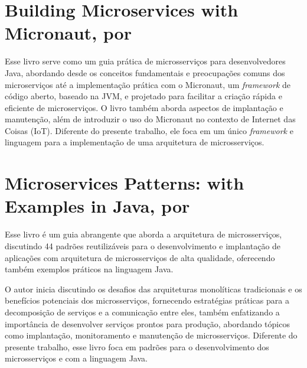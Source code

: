 \section{Building Microservices with Micronaut, por \texorpdfstring{}{Singh, Dawood e The Micronaut® Foundation (2021)}}
Esse livro serve como um guia prática de microsserviços para desenvolvedores Java, abordando desde os conceitos fundamentais e preocupações comuns dos microserviços até a implementação prática com o Micronaut, um \emph{framework} de código aberto, baseado na JVM, e projetado para facilitar a criação rápida e eficiente de microserviços. O livro também aborda aspectos de implantação e manutenção, além de introduzir o uso do Micronaut no contexto de Internet das Coisas (IoT). Diferente do presente trabalho, ele foca em um único \emph{framework} e linguagem para a implementação de uma arquitetura de microsserviços.


\section{Microservices Patterns: with Examples in Java, por \texorpdfstring{}{Richardson (2019)}}

Esse livro é um guia abrangente que aborda a arquitetura de microsserviços, discutindo 44 padrões reutilizáveis para o desenvolvimento e implantação de aplicações com arquitetura de microsserviços de alta qualidade, oferecendo também exemplos práticos na linguagem Java.

O autor inicia discutindo os desafios das arquiteturas monolíticas tradicionais e os benefícios potenciais dos microsserviços, fornecendo estratégias práticas para a decomposição de serviços e a comunicação entre eles, também enfatizando a importância de desenvolver serviços prontos para produção, abordando tópicos como implantação, monitoramento e manutenção de microsserviços. Diferente do presente trabalho, esse livro foca em padrões para o desenvolvimento dos microsserviços e com a linguagem Java.

